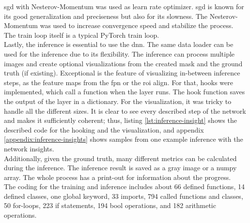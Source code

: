 		\ac{sgd} with Nesterov-Momentum \cite{Botev2016} was used as learn rate optimizer. \ac{sgd} is known for its good generalization and preciseness but also for its slowness. The Nesterov-Momentum was used to increase convergence speed and stabilize the process.\\
		The train loop itself is a typical PyTorch train loop. \\
		Lastly, the inference is essential to use the \ac{dnn}. The same data loader can be used for the inference due to its flexibility. The inference can process multiple images and create optional visualizations from the created mask and the ground truth (if existing). Exceptional is the feature of visualizing in-between inference steps, as the feature maps from the \ac{fpn} or the \ac{roi} align. For that, hooks were implemented, which call a function when the layer runs. The hook function saves the output of the layer in a dictionary. For the visualization, it was tricky to handle all the different sizes. It is clear to see every described step of the network and makes it sufficiently coherent; thus, listing \ref{lst:inference-insight} shows the described code for the hooking and the visualization, and appendix \ref{appendix:inference-insights} shows samples from one example inference with the network insights.\\
		Additionally, given the ground truth, many different metrics can be calculated during the inference. The inference result is saved as a gray image or a numpy array. The whole process has a print-out for information about the progress.\\
		The coding for the training and inference includes about 66 defined functions, 14 defined classes, one global keyword, 33 imports, 794 called functions and classes, 50 for-loops, 223 if statements, 194 bool operations, and 182 arithmetic operations.
	
		\clearpage
	
	
